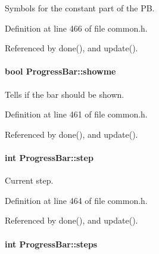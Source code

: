 Symbols for the constant part of the PB. 



Definition at line 466 of file common.h.



Referenced by done(), and update().

\hypertarget{classProgressBar_ac68fc70a51d5ece6ed58c9d1eee894a0}{
\paragraph[{showme}]{\setlength{\rightskip}{0pt plus 5cm}bool {\bf ProgressBar::showme}}\hfill}
\label{classProgressBar_ac68fc70a51d5ece6ed58c9d1eee894a0}


Tells if the bar should be shown. 



Definition at line 461 of file common.h.



Referenced by done(), and update().

\hypertarget{classProgressBar_a306e360a98b4f0a88ce0e88e6a2fda2d}{
\paragraph[{step}]{\setlength{\rightskip}{0pt plus 5cm}int {\bf ProgressBar::step}}\hfill}
\label{classProgressBar_a306e360a98b4f0a88ce0e88e6a2fda2d}


Current step. 



Definition at line 464 of file common.h.



Referenced by done(), and update().

\hypertarget{classProgressBar_ac8b6d8289e1c4183a9c1284da9f24f41}{
\paragraph[{steps}]{\setlength{\rightskip}{0pt plus 5cm}int {\bf ProgressBar::steps}}\hfill}
\label{classProgressBar_ac8b6d8289e1c4183a9c1284da9f24f41}


